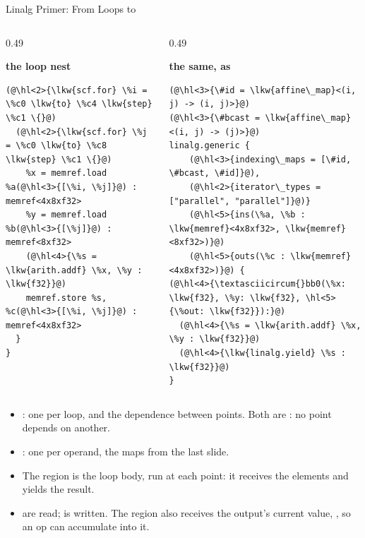\documentclass[aspectratio=169,10pt]{beamer}
\begin{document}
\begin{frame}[fragile]{Linalg Primer: From Loops to }
  \begin{columns}[t]
    \begin{column}{0.49\textwidth}
      \begin{center}\small\textbf{the loop nest}\end{center}
\begin{lstlisting}[style=half,language=mlir]
(@\hl<2>{\lkw{scf.for} \%i = \%c0 \lkw{to} \%c4 \lkw{step} \%c1 \{}@)
  (@\hl<2>{\lkw{scf.for} \%j = \%c0 \lkw{to} \%c8 \lkw{step} \%c1 \{}@)
    %x = memref.load %a(@\hl<3>{[\%i, \%j]}@) : memref<4x8xf32>
    %y = memref.load %b(@\hl<3>{[\%j]}@) : memref<8xf32>
    (@\hl<4>{\%s = \lkw{arith.addf} \%x, \%y : \lkw{f32}}@)
    memref.store %s, %c(@\hl<3>{[\%i, \%j]}@) : memref<4x8xf32>
  }
}
\end{lstlisting}
    \end{column}
    \begin{column}{0.49\textwidth}
      \begin{center}\small\textbf{the same, as }\end{center}
\begin{lstlisting}[style=half,language=mlir]
(@\hl<3>{\#id = \lkw{affine\_map}<(i, j) -> (i, j)>}@)
(@\hl<3>{\#bcast = \lkw{affine\_map}<(i, j) -> (j)>}@)
linalg.generic {
    (@\hl<3>{indexing\_maps = [\#id, \#bcast, \#id]}@),
    (@\hl<2>{iterator\_types = ["parallel", "parallel"]}@)}
    (@\hl<5>{ins(\%a, \%b : \lkw{memref}<4x8xf32>, \lkw{memref}<8xf32>)}@)
    (@\hl<5>{outs(\%c : \lkw{memref}<4x8xf32>)}@) {
(@\hl<4>{\textasciicircum{}bb0(\%x: \lkw{f32}, \%y: \lkw{f32}, \hl<5>{\%out: \lkw{f32}}):}@)
  (@\hl<4>{\%s = \lkw{arith.addf} \%x, \%y : \lkw{f32}}@)
  (@\hl<4>{\lkw{linalg.yield} \%s : \lkw{f32}}@)
}
\end{lstlisting}
    \end{column}
  \end{columns}
  \vspace{0.5em}
  \begin{itemize}
    \item<2-> : one per loop, and the dependence between
      points. Both are : no point depends on another.
    \item<3-> : one per operand, the maps from the last
      slide.
    \item<4-> The region is the loop body, run at each point: it receives the
      elements and yields the result.
    \item<5->  are read;  is written. The region also
      receives the output's current value, , so an op can
      accumulate into it.
  \end{itemize}
\end{frame}
\end{document}
